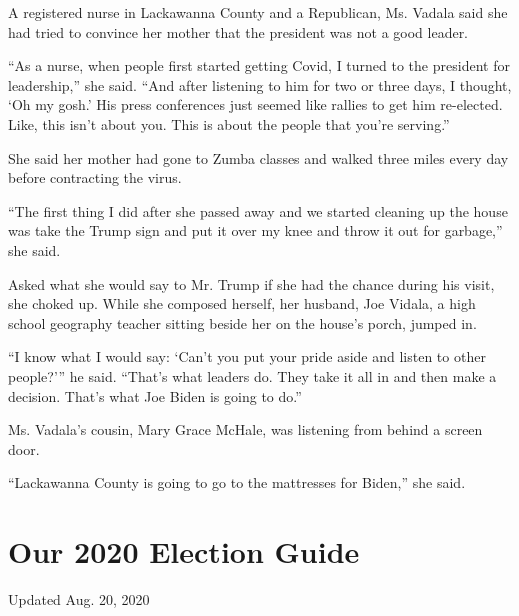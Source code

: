 A registered nurse in Lackawanna County and a Republican, Ms. Vadala
said she had tried to convince her mother that the president was not a
good leader.

``As a nurse, when people first started getting Covid, I turned to the
president for leadership,'' she said. ``And after listening to him for
two or three days, I thought, `Oh my gosh.' His press conferences just
seemed like rallies to get him re-elected. Like, this isn't about you.
This is about the people that you're serving.''

She said her mother had gone to Zumba classes and walked three miles
every day before contracting the virus.

``The first thing I did after she passed away and we started cleaning up
the house was take the Trump sign and put it over my knee and throw it
out for garbage,'' she said.

Asked what she would say to Mr. Trump if she had the chance during his
visit, she choked up. While she composed herself, her husband, Joe
Vidala, a high school geography teacher sitting beside her on the
house's porch, jumped in.

``I know what I would say: `Can't you put your pride aside and listen to
other people?''' he said. ``That's what leaders do. They take it all in
and then make a decision. That's what Joe Biden is going to do.''

Ms. Vadala's cousin, Mary Grace McHale, was listening from behind a
screen door.

``Lackawanna County is going to go to the mattresses for Biden,'' she
said.

\hypertarget{our-2020-election-guide}{%
\section{Our 2020 Election Guide}\label{our-2020-election-guide}}

Updated Aug. 20, 2020

